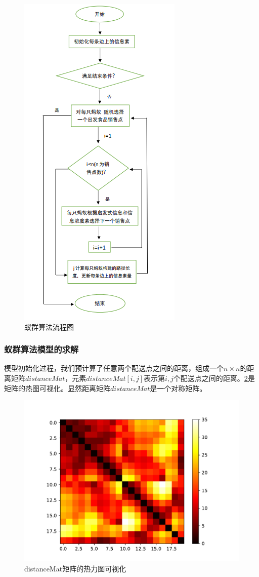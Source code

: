 \documentclass{cumcmthesis}
\begin{document}
    \begin{figure}[H]
            \centering
            \includegraphics[width=.5\textwidth]{figure/aco.png}
            \caption{蚁群算法流程图}
            \label{fig:aco}
    \end{figure}


    \subsubsection{蚁群算法模型的求解}
    
    模型初始化过程，我们预计算了任意两个配送点之间的距离，组成一个$n\times n$的距离矩阵$distanceMat$，元素$distanceMat[i,j]$表示第$i,j$个配送点之间的距离。\cref{fig:distMat}是矩阵的热图可视化。显然距离矩阵$distanceMat$是一个对称矩阵。

    \begin{figure}[!h]
            \centering
            \includegraphics[width=.9\textwidth]{figure/dist_mat_TS.pdf}
            \caption{distanceMat矩阵的热力图可视化}
            \label{fig:distMat}
    \end{figure}
\end{document}
